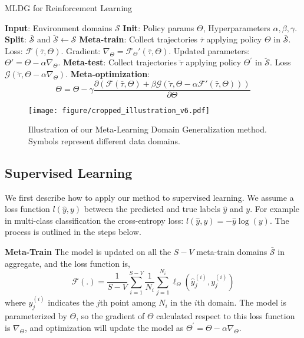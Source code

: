 \documentclass[letterpaper]{article} \usepackage{aaai18}  \usepackage{times}  \usepackage{helvet}  \usepackage{courier}  \usepackage{url}  \usepackage{graphicx}  \usepackage{amsmath}
\newcommand{\keypoint}[1]{\vspace{0.1cm}\noindent\textbf{#1}\quad}
\begin{document}
  \begin{algorithm}[t]
   \caption{MLDG for Reinforcement Learning}\label{alg:mldg-rl}
\begin{algorithmic}[1]
\State \textbf{Input}: Environment domains $\mathcal{S}$
\State \textbf{Init}: Policy params $\Theta$, Hyperparameters $\alpha,\beta,\gamma$.
\State \textbf{Split}: $\bar{\mathcal{S}}$ and $\breve{\mathcal{S}} \gets \mathcal{S}$ 
\State \textbf{Meta-train}: 
\State Collect trajectories $\bar{\tau}$ applying policy $\Theta$ in $\bar{\mathcal{S}}$.
\State Loss: $\mathcal{F}(\bar{\tau}, \Theta)$.
\State Gradient: $\nabla_{\Theta} = \mathcal{F}_{\Theta}'(\bar{\tau}, \Theta)$.
\State Updated parameters: $\Theta'=\Theta - \alpha \nabla_{\Theta}$.
\State \textbf{Meta-test}: \State Collect trajectories $\breve{\tau}$ applying policy $\Theta^{'}$ in $\breve{\mathcal{S}}$.
\State Loss $\mathcal{G}(\breve{\tau}, \Theta - \alpha\nabla_{\Theta})$.
\State \textbf{Meta-optimization}: $$\Theta = \Theta - \gamma \frac{\partial (\mathcal{F}(\bar{\tau}, \Theta) + \beta \mathcal{G}(\breve{\tau}, \Theta - \alpha \mathcal{F}'(\bar{\tau}, \Theta)))}{\partial \Theta}  $$
\EndFor
\EndProcedure
\end{algorithmic}
  \end{algorithm}
  
\begin{figure}[t]
\centering
\texttt{[image: figure/cropped\_illustration\_v6.pdf]}
\caption{Illustration of our Meta-Learning Domain Generalization method. Symbols represent different data domains.}
\label{illustration}
\end{figure}
  
\subsection{Supervised Learning}

We first describe how to apply our method to supervised learning. We assume a loss function $l(\hat{y}, y)$ between the predicted and true labels $\hat{y}$ and $y$. For example in multi-class classification the cross-entropy loss: $l(\hat{y}, y) = -\hat{y} \log (y)$. The process is outlined in the steps below. 

\keypoint{Meta-Train} The model is updated on all the $S-V$ meta-train domains $\bar{\mathcal{S}}$ in aggregate, and the loss function is,
\begin{equation}
\label{meta-train}
\mathcal{F}(.) = \frac{1}{S-V} \sum^{S-V}_{i=1}\frac{1}{{N_i}}\sum^{N_i}_{j=1} \ell_\Theta(\hat{{y}}^{(i)}_j,{y}^{(i)}_j)
\end{equation}
\noindent where ${y}^{(i)}_j$ indicates the $j$th point among ${N_i}$ in the $i$th domain. The model is parameterized by $\Theta$, so the gradient of $\Theta$ calculated respect to this loss function is $\nabla_{\Theta}$, and optimization will update the model as $\Theta^{'} =\Theta - \alpha \nabla_{\Theta}$.
\end{document}
